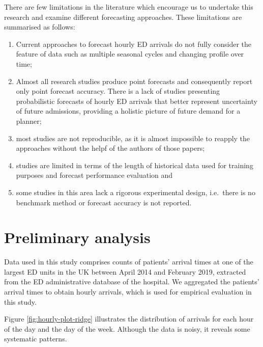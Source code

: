 \documentclass[]{elsarticle} %
\providecommand{\tightlist}{%
  \setlength{\itemsep}{0pt}\setlength{\parskip}{0pt}}
\begin{document}
There are few limitations in the literature which encourage us to undertake this research and examine different forecasting approaches. These limitations are summarised as follows:

\begin{enumerate}
\def\labelenumi{(\roman{enumi})}
\tightlist
\item
  Current approaches to forecast hourly ED arrivals do not fully consider the feature of data such as multiple seasonal cycles and changing profile over time;
\item
  Almost all research studies produce point forecasts and consequently report only point forecast accuracy. There is a lack of studies presenting probabilistic forecasts of hourly ED arrivals that better represent uncertainty of future admissions, providing a holistic picture of future demand for a planner;
\item
  most studies are not reproducible, as it is almost impossible to reapply the approaches without the helpf of the authors of those papers;
\item
  studies are limited in terms of the length of historical data used for training purposes and forecast performance evaluation and
\item
  some studies in this area lack a rigorous experimental design, i.e.~there is no benchmark method or forecast accuracy is not reported.
\end{enumerate}

\hypertarget{data}{%
\section{Preliminary analysis}\label{data}}

Data used in this study comprises counts of patients' arrival times at one of the largest ED units in the UK between April 2014 and February 2019, extracted from the ED administrative database of the hospital. We aggregated the patients' arrival times to obtain hourly arrivals, which is used for empirical evaluation in this study.

Figure \ref{fig:hourly-plot-ridge} illustrates the distribution of arrivals for each hour of the day and the day of the week. Although the data is noisy, it reveals some systematic patterns.
\end{document}

